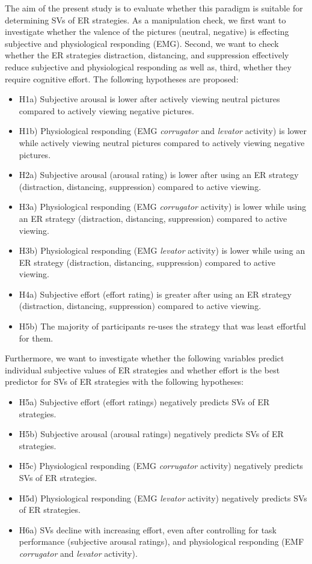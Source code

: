 \documentclass[
  english,
  man,floatsintext]{apa6}
\begin{document}
The aim of the present study is to evaluate whether this paradigm is suitable for determining SVs of ER strategies.
As a manipulation check, we first want to investigate whether the valence of the pictures (neutral, negative) is effecting subjective and physiological responding (EMG).
Second, we want to check whether the ER strategies distraction, distancing, and suppression effectively reduce subjective and physiological responding as well as, third, whether they require cognitive effort.
The following hypotheses are proposed:

\begin{itemize}
\item
  H1a) Subjective arousal is lower after actively viewing neutral pictures compared to actively viewing negative pictures.
\item
  H1b) Physiological responding (EMG \emph{corrugator} and \emph{levator} activity) is lower while actively viewing neutral pictures compared to actively viewing negative pictures.
\item
  H2a) Subjective arousal (arousal rating) is lower after using an ER strategy (distraction, distancing, suppression) compared to active viewing.
\item
  H3a) Physiological responding (EMG \emph{corrugator} activity) is lower while using an ER strategy (distraction, distancing, suppression) compared to active viewing.
\item
  H3b) Physiological responding (EMG \emph{levator} activity) is lower while using an ER strategy (distraction, distancing, suppression) compared to active viewing.
\item
  H4a) Subjective effort (effort rating) is greater after using an ER strategy (distraction, distancing, suppression) compared to active viewing.
\item
  H5b) The majority of participants re-uses the strategy that was least effortful for them.
\end{itemize}

Furthermore, we want to investigate whether the following variables predict individual subjective values of ER strategies and whether effort is the best predictor for SVs of ER strategies with the following hypotheses:

\begin{itemize}
\item
  H5a) Subjective effort (effort ratings) negatively predicts SVs of ER strategies.
\item
  H5b) Subjective arousal (arousal ratings) negatively predicts SVs of ER strategies.
\item
  H5c) Physiological responding (EMG \emph{corrugator} activity) negatively predicts SVs of ER strategies.
\item
  H5d) Physiological responding (EMG \emph{levator} activity) negatively predicts SVs of ER strategies.
\item
  H6a) SVs decline with increasing effort, even after controlling for task performance (subjective arousal ratings), and physiological responding (EMF \emph{corrugator} and \emph{levator} activity).
\end{itemize}
\end{document}
